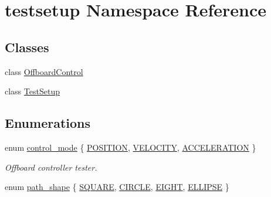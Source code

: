 \hypertarget{namespacetestsetup}{}\section{testsetup Namespace Reference}
\label{namespacetestsetup}
\subsection*{Classes}
\begin{DoxyCompactItemize}
\item 
class \mbox{\hyperlink{classtestsetup_1_1OffboardControl}{Offboard\+Control}}
\item 
class \mbox{\hyperlink{classtestsetup_1_1TestSetup}{Test\+Setup}}
\end{DoxyCompactItemize}
\subsection*{Enumerations}
\begin{DoxyCompactItemize}
\item 
enum \mbox{\hyperlink{group__sitl__test_ga9930fec0e85d9181d854dcce4228fabc}{control\+\_\+mode}} \{ \mbox{\hyperlink{group__sitl__test_gga9930fec0e85d9181d854dcce4228fabca7dfb3fa5c34c3d6d2f3a550112bf2150}{P\+O\+S\+I\+T\+I\+ON}}, 
\mbox{\hyperlink{group__sitl__test_gga9930fec0e85d9181d854dcce4228fabca115c50ce38c0786c1a426fcc448c5ca1}{V\+E\+L\+O\+C\+I\+TY}}, 
\mbox{\hyperlink{group__sitl__test_gga9930fec0e85d9181d854dcce4228fabca7fc2250d8164a6ad63d166c01c0f004a}{A\+C\+C\+E\+L\+E\+R\+A\+T\+I\+ON}}
 \}
\begin{DoxyCompactList}\small\item\em Offboard controller tester. \end{DoxyCompactList}\item 
enum \mbox{\hyperlink{group__sitl__test_gad3657f391114032d03b465fccb47befa}{path\+\_\+shape}} \{ \mbox{\hyperlink{group__sitl__test_ggad3657f391114032d03b465fccb47befaaae0dd73f6e88593569286ac6170d2ea3}{S\+Q\+U\+A\+RE}}, 
\mbox{\hyperlink{group__sitl__test_ggad3657f391114032d03b465fccb47befaa3865ccc00605d98b2623d71800e065b8}{C\+I\+R\+C\+LE}}, 
\mbox{\hyperlink{group__sitl__test_ggad3657f391114032d03b465fccb47befaa0412369f29b1207be79090ec6e24ca64}{E\+I\+G\+HT}}, 
\mbox{\hyperlink{group__sitl__test_ggad3657f391114032d03b465fccb47befaad38385721e4aa330ebf9d94f6446b885}{E\+L\+L\+I\+P\+SE}}
 \}
\end{DoxyCompactItemize}
